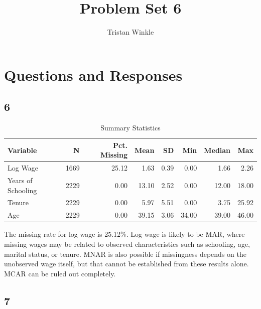 \documentclass[12pt]{article}
\title{Problem Set 6}
\author{Tristan Winkle}
\date{}
\begin{document}
\maketitle

\section{Questions and Responses}

\subsection*{6}

\begin{table}[!htbp]
\centering
\caption{Summary Statistics}
\vspace{0.5em}
\begin{minipage}{0.82\textwidth}
\centering
\begin{tabular}{lrrrrrrr}
\toprule
Variable & N & Pct. Missing & Mean & SD & Min & Median & Max \\
\midrule
Log Wage & 1669 & 25.12 & 1.63 & 0.39 & 0.00 & 1.66 & 2.26 \\
Years of Schooling     & 2229 & 0.00  & 13.10 & 2.52 & 0.00 & 12.00 & 18.00 \\
Tenure  & 2229 & 0.00  & 5.97  & 5.51 & 0.00 & 3.75  & 25.92 \\
Age     & 2229 & 0.00  & 39.15 & 3.06 & 34.00 & 39.00 & 46.00 \\
\bottomrule
\end{tabular}

\vspace{0.5em}
\footnotesize
\end{minipage}
\end{table}

\noindent The missing rate for log wage is 25.12\%. Log wage is likely to be MAR, where missing wages may be related to observed characteristics such as schooling, age, marital status, or tenure. MNAR is also possible if missingness depends on the unobserved wage itself, but that cannot be established from these results alone. MCAR can be ruled out completely. 

\pagebreak 

\subsection*{7}
\end{document}
